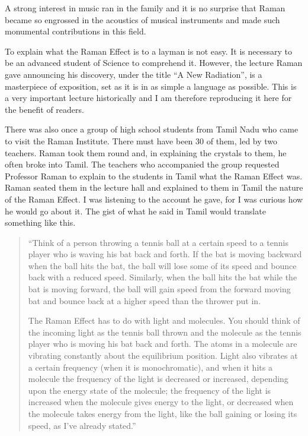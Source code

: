 A strong interest in music ran in the family and it is no surprise that Raman became so engrossed in the acoustics of musical instruments and made such monumental contributions in this field.

\bigskip
{}
\smallskip



\noindent
To explain what the Raman Effect is to a layman is not easy. It is necessary to be an advanced student of Science to comprehend it. However, the lecture Raman gave announcing his discovery, under the title ``A New Radiation'', is a masterpiece of exposition, set as it is in as simple a language as possible. This is a very important lecture historically and I am therefore reproducing it here for the benefit of readers.

There was also once a group of high school students from Tamil Nadu who came to visit the Raman Institute. There must have been 30 of them, led by two teachers. Raman took them round and, in explaining the crystals to them, he often broke into Tamil. The teachers who accompanied the group requested Professor Raman to explain to the students in Tamil what the Raman Effect was. Raman seated them in the lecture hall and explained to them in Tamil the nature of the Raman Effect. I was listening to the account he gave, for I was curious how he would go about it. The gist of what he said in Tamil would translate something like this.
\begin{quote}
{\fontsize{10pt}{12pt}\selectfont
``Think of a person throwing a tennis ball at a certain speed to a tennis player who is waving his bat back and forth. If the bat is moving backward when the ball hits the bat, the ball will lose some of its speed and bounce back with a reduced speed. Similarly, when the ball hits the bat while the bat is moving forward, the ball will gain speed from the forward moving bat and bounce back at a higher speed than the thrower put in.

The Raman Effect has to do with light and molecules. You should think of the incoming light as the tennis ball thrown and the molecule as the tennis player who is moving his bat back and forth. The atoms in a molecule are vibrating constantly about the equilibrium position. Light also vibrates at a certain frequency (when it is monochromatic), and when it hits a molecule the frequency of the light is decreased or increased, depending upon the energy state of the molecule; the frequency of the light is increased when the molecule gives energy to the light, or decreased when the molecule takes energy from the light, like the ball gaining or losing its speed, as I've already stated.''}\relax
\end{quote}

